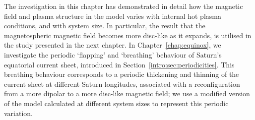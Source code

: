The investigation in  this chapter has demonstrated in detail how the magnetic field and plasma structure in the \citet{achilleos2010a} model varies with internal hot plasma conditions, and with system size. In particular, the result that the magnetospheric magnetic field becomes more disc-like as it expands, is utilised in the study presented in the next chapter. In Chapter~\ref{chap:equinox}, we investigate the periodic `flapping' and `breathing' behaviour of Saturn's equatorial current sheet, introduced in Section~\ref{intro:sec:periodicities}.  This breathing behaviour  corresponds to a periodic thickening and thinning of the current sheet at different Saturn  longitudes, associated with a reconfiguration from a more dipolar to a more disc-like magnetic field; we use a modified version of the \citet{achilleos2010a} model calculated at different system sizes to represent this periodic variation.